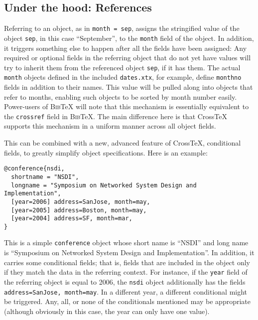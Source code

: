 \documentclass{article}
\newcommand{\XTX}{Cross\TeX}
\newcommand{\BibTeX}{\textsc{Bib}\TeX}
\begin{document}
\subsection{Under the hood: References}

Referring to an object, as in \texttt{month = sep}, assigns the
stringified value of the object \texttt{sep}, in this case ``September'',
to the \texttt{month} field of the object. In addition, it triggers
something else to happen after all the fields have been assigned:
Any required or optional fields in the referring object that do not
yet have values will try to inherit them from the referenced object
\texttt{sep}, if it has them. The actual \texttt{month} objects defined
in the included \texttt{dates.xtx}, for example, define \texttt{monthno}
fields in addition to their names. This value will be pulled along into
objects that refer to months, enabling such objects to be sorted by month
number easily. Power-users of \BibTeX{} will note that this mechanism is
essentially equivalent to the \texttt{crossref} field in \BibTeX{}. The
main difference here is that \XTX{} supports this mechanism in a uniform
manner across all object fields.

This can be combined with a new, advanced feature of \XTX{}, conditional
fields, to greatly simplify object specifications. Here is an example:

\begin{small}\begin{verbatim}
@conference{nsdi,
  shortname = "NSDI",
  longname = "Symposium on Networked System Design and Implementation", 
  [year=2006] address=SanJose, month=may,
  [year=2005] address=Boston, month=may,
  [year=2004] address=SF, month=mar,
}
\end{verbatim}\end{small}

This is a simple \texttt{conference} object whose short name is
``NSDI'' and long name is ``Symposium on Networked System Design and
Implementation''. In addition, it carries some conditional fields; that
is, fields that are included in the object only if they match the data
in the referring context. For instance, if the \texttt{year} field of the
referring object is equal to 2006, the \texttt{nsdi} object additionally
has the fields \texttt{address=SanJose, month=may}. In a different year,
a different conditional might be triggered. Any, all, or none of the
conditionals mentioned may be appropriate (although obviously in this
case, the year can only have one value).
\end{document}
